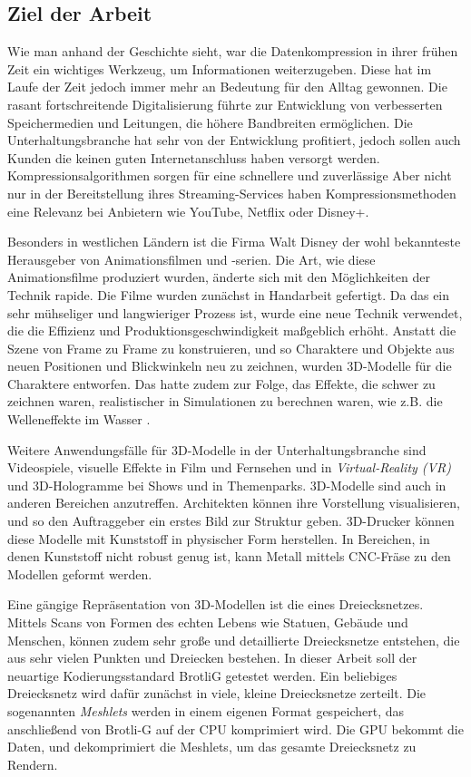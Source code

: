 \subsection{Ziel der Arbeit}
Wie man anhand der Geschichte sieht, war die Datenkompression in ihrer frühen Zeit ein wichtiges Werkzeug, um Informationen weiterzugeben.
Diese hat im Laufe der Zeit jedoch immer mehr an Bedeutung für den Alltag gewonnen.
Die rasant fortschreitende Digitalisierung führte zur Entwicklung von verbesserten Speichermedien und Leitungen, die höhere Bandbreiten ermöglichen.
Die Unterhaltungsbranche hat sehr von der Entwicklung profitiert, jedoch sollen auch Kunden die keinen guten Internetanschluss haben versorgt werden.
Kompressionsalgorithmen sorgen für eine schnellere und zuverlässige 
Aber nicht nur in der Bereitstellung ihres Streaming-Services haben Kompressionsmethoden eine Relevanz bei Anbietern wie YouTube, Netflix oder Disney+. \newline

Besonders in westlichen Ländern ist die Firma Walt Disney der wohl bekannteste Herausgeber von Animationsfilmen und -serien.
Die Art, wie diese Animationsfilme produziert wurden, änderte sich mit den Möglichkeiten der Technik rapide.
Die Filme wurden zunächst in Handarbeit gefertigt.
Da das ein sehr mühseliger und langwieriger Prozess ist, wurde eine neue Technik verwendet, die die Effizienz und Produktionsgeschwindigkeit maßgeblich erhöht.
Anstatt die Szene von Frame zu Frame zu konstruieren, und so Charaktere und Objekte aus neuen Positionen und Blickwinkeln neu zu zeichnen, wurden 3D-Modelle für die Charaktere entworfen.
Das hatte zudem zur Folge, das Effekte, die schwer zu zeichnen waren, realistischer in Simulationen zu berechnen waren, wie z.B. die Welleneffekte im Wasser \cite{Disney2021}. \newline

Weitere Anwendungsfälle für 3D-Modelle in der Unterhaltungsbranche sind Videospiele, visuelle Effekte in Film und Fernsehen und in \textit{Virtual-Reality (VR)} und 3D-Hologramme bei Shows und in Themenparks. 
3D-Modelle sind auch in anderen Bereichen anzutreffen.
Architekten können ihre Vorstellung visualisieren, und so den Auftraggeber ein erstes Bild zur Struktur geben.
3D-Drucker können diese Modelle mit Kunststoff in physischer Form herstellen.
In Bereichen, in denen Kunststoff nicht robust genug ist, kann Metall mittels CNC-Fräse zu den Modellen geformt werden. \newline

Eine gängige Repräsentation von 3D-Modellen ist die eines Dreiecksnetzes.
Mittels Scans von Formen des echten Lebens wie Statuen, Gebäude und Menschen, können zudem sehr große und detaillierte Dreiecksnetze entstehen, die aus sehr vielen Punkten und Dreiecken bestehen.
In dieser Arbeit soll der neuartige Kodierungsstandard BrotliG getestet werden.
Ein beliebiges Dreiecksnetz wird dafür zunächst in viele, kleine Dreiecksnetze zerteilt.
Die sogenannten \textit{Meshlets} werden in einem eigenen Format gespeichert, das anschließend von Brotli-G auf der CPU komprimiert wird.
Die GPU bekommt die Daten, und dekomprimiert die Meshlets, um das gesamte Dreiecksnetz zu Rendern.
